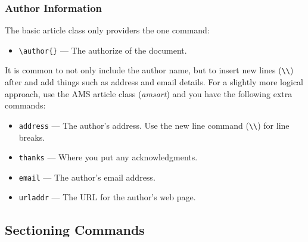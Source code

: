 \documentclass{article}
\begin{document}
\subsubsection{Author Information}
\label{sec:author-information}

The basic article class only providers the one command:
\begin{itemize}
\item \verb|\author{}| --- The authorize of the document.
\end{itemize}

It is common to not only include the author name, but to insert new lines (\verb|\\|)
after and add things such as address and email details.  For a slightly more logical
approach, use the AMS article class (\emph{amsart}) and you have the following extra
commands:

\begin{itemize}
\item \verb|address| --- The author's address. Use the new line command (\verb|\\|) for line
breaks.
\item \verb|thanks| --- Where you put any acknowledgments.
\item \verb|email| --- The author's email address.
\item \verb|urladdr| --- The URL for the author's web page.
\end{itemize}

\subsection{Sectioning Commands}
\label{sec:sectioning-commands}
\end{document}
